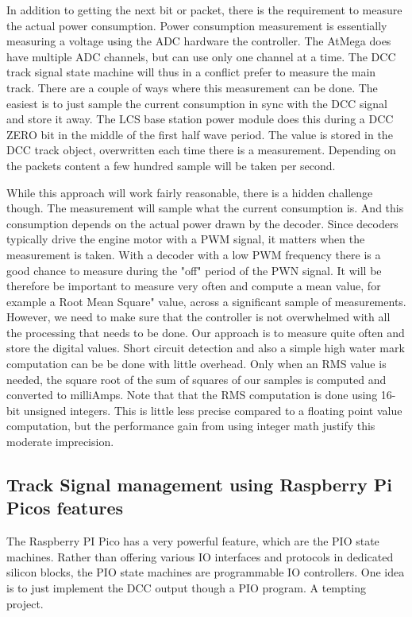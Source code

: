 In addition to getting the next bit or packet, there is the requirement to measure the actual power consumption. Power consumption measurement is essentially measuring a voltage using the ADC hardware the controller. The AtMega does have multiple ADC channels, but can use only one channel at a time. The DCC track signal state machine will thus in a conflict prefer to measure the main track. There are a couple of ways where this measurement can be done. The easiest is to just sample the current consumption in sync with the DCC signal and store it away. The LCS base station power module does this during a DCC ZERO bit in the middle of the first half wave period. The value is stored in the DCC track object, overwritten each time there is a measurement. Depending on the packets content a few hundred sample will be taken per second.

While this approach will work fairly reasonable, there is a hidden challenge though. The measurement will sample what the current consumption is. And this consumption depends on the actual power drawn by the decoder. Since decoders typically drive the engine motor with a PWM signal, it matters when the measurement is taken. With a decoder with a low PWM frequency there is a good chance to measure during the "off" period of the PWN signal. It will be therefore be important to measure very often and compute a mean value, for example a Root Mean Square" value, across a significant sample of measurements. However, we need to make sure that the controller is not overwhelmed with all the processing that needs to be done. Our approach is to measure quite often and store the digital values. Short circuit detection and also a simple high water mark computation can be be done with little overhead. Only when an RMS value is needed, the square root of the sum of squares of our samples is computed and converted to milliAmps. Note that that the RMS computation is done using 16-bit unsigned integers. This is little less precise compared to a floating point value computation, but the performance gain from using integer math justify this moderate imprecision.

\subsection{Track Signal management using Raspberry Pi Picos features}

The Raspberry PI Pico has a very powerful feature, which are the PIO state machines. Rather than offering various IO interfaces and protocols in dedicated silicon blocks, the PIO state  machines are programmable IO controllers. One idea is to just implement the DCC output though a PIO program. A tempting project.


